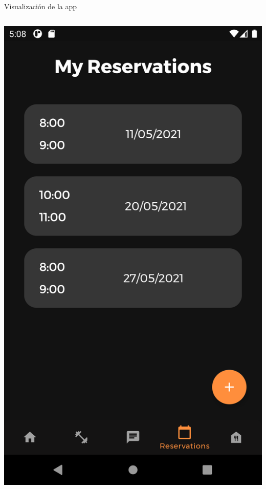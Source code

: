 \documentclass[12pt]{beamer}
\begin{document}
\begin{frame}{Visualización de la app}
\begin{columns}[t]
\centering
\includegraphics[width=\textwidth]{gymodo_your_reservations}
\centering

\end{columns}
\end{frame}
\end{document}
